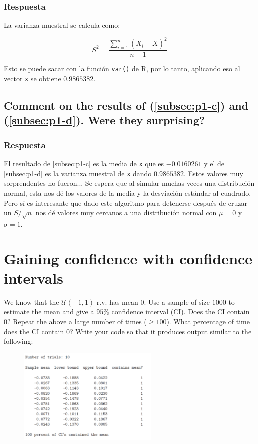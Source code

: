 \documentclass[12pt]{article}\usepackage[]{graphicx}\usepackage[]{xcolor}
\begin{document}
\subsubsection{Respuesta}

La varianza muestral se calcula como:

\[
S^{2} = \frac{\sum_{i=1}^{n} (X_{i} - \bar{X})^{2}}{n-1}
\]

Esto se puede sacar con la función \lstinline|var()| de \textsf{R}, por lo tanto, aplicando eso al vector \lstinline|x| se obtiene $0.9865382$.



\subsection{Comment on the results of (\ref{subsec:p1-c}) and (\ref{subsec:p1-d}). Were they surprising?}
\label{subsec:p1-e}

\subsubsection{Respuesta}

El resultado de \ref{subsec:p1-c} es la media de \lstinline|x| que es $-0.0160261$ y el de \ref{subsec:p1-d} es la varianza muestral de \lstinline|x| dando $0.9865382$. Estos valores muy sorprendentes no fueron... Se espera que al simular muchas veces una distribución normal, esta nos dé los valores de la media y la desviación estándar al cuadrado. Pero sí es interesante que dado este algoritmo para detenerse después de cruzar un $S / \sqrt{n}$ nos dé valores muy cercanos a una distribución normal con $\mu = 0$ y $\sigma = 1$.


\newpage

\section{Gaining confidence with confidence intervals}

We know that the $\mathcal{U}(-1, 1)$ r.v. has mean 0. Use a sample of size $1000$ to estimate the mean and give a $95\%$ confidence interval (CI). Does the CI contain 0? Repeat the above a large number of times ($\geq  100$). What percentage of time does the CI contain 0? Write your code so that it produces output similar to the following:

\begin{figure}[ht]
  \centering
  \includegraphics[width=0.6\textwidth]{img/Punto2.png}
\end{figure}
\end{document}
